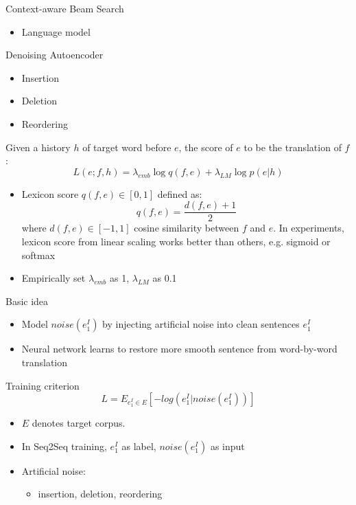 \documentclass[11pt, a4paper, landscape]{article}
\begin{document}
	\NewPage
	\vfill
	Context-aware Beam Search
	\begin{itemize}
		\item Language model\\
	\end{itemize}
	Denoising Autoencoder
	\begin{itemize}
		\item Insertion
		\item Deletion
		\item Reordering
	\end{itemize}	
	\vfill
		
	\NewPage
	
	\vfill
	Given a history $h$ of target word before $e$, the score of $e$ to be the translation of $f$:
	\[ L(e;f,h)=\lambda_{emb}\log q(f,e) + \lambda_{LM} \log p(e|h)\]	
	\begin{itemize}
		\item Lexicon score $q(f,e) \in [0,1] $ defined as:
		\[ q(f,e)= \frac{d(f,e)+1}{2}\]
		where $d(f,e)\in [-1,1]$ cosine similarity between $f$ and $e$. In experiments, lexicon score from linear scaling works better than others, e.g. sigmoid or softmax
		\item Empirically set ${\lambda_{emb}}$  as 1, ${\lambda_{LM}}$ as 0.1
	\end{itemize}	
	\vfill
	
\NewPage
{}	
\vfill
	Basic idea
	\begin{itemize}
		\item Model ${noise}(e_1^I)$ by injecting artificial noise into clean sentences $e_1^I$
		\item Neural network learns to restore more smooth sentence from word-by-word translation\\
	\end{itemize}
	 Training criterion
	\[ L = E_{e_1^I \in E}[-log(e_1^I|noise(e_1^I))]\]
	\begin{itemize}
		\item $E$ denotes target corpus.
		\item In Seq2Seq training, $e_1^I$ as label, $noise(e_1^I)$  as input 
		\item Artificial noise:
		\begin{itemize}
			\item insertion, deletion, reordering
		\end{itemize} 
	\end{itemize}
\end{document}
